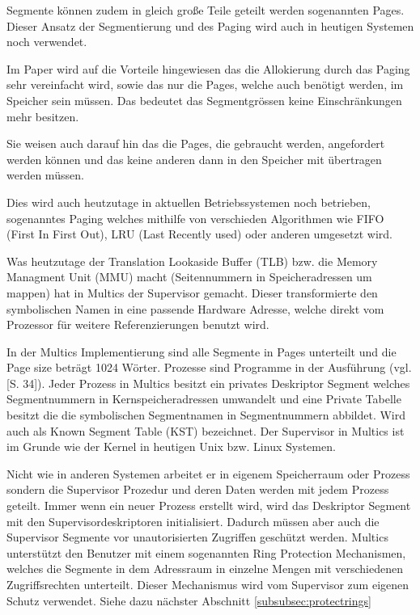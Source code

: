 \documentclass[9pt,technote]{IEEEtran}
\begin{document}
	      Segmente k\"onnen zudem in gleich gro\ss e Teile geteilt werden sogenannten Pages. Dieser Ansatz der Segmentierung
	      und des Paging wird auch in heutigen Systemen noch verwendet.
	     
	      Im Paper \cite{inproc:multics} wird auf die Vorteile hingewiesen das die Allokierung durch das Paging sehr vereinfacht wird,
	      sowie das nur die Pages, welche auch ben\"otigt werden, im Speicher sein m\"ussen. 
	      Das bedeutet das Segmentgr\"ossen keine Einschr\"ankungen mehr besitzen.
	     
	      Sie weisen auch darauf hin das die Pages, die gebraucht werden, angefordert werden k\"onnen und das keine anderen dann in 
	      den Speicher mit \"ubertragen werden m\"ussen.
	     
	      Dies wird auch heutzutage in aktuellen Betriebssystemen noch betrieben, sogenanntes Paging welches mithilfe von
	      verschieden Algorithmen wie FIFO (First In First Out), LRU (Last Recently used) oder anderen umgesetzt wird.
	 
	      Was heutzutage der Translation Lookaside Buffer (TLB) bzw. die Memory Managment Unit (MMU) macht
	      (Seitennummern in Speicheradressen um mappen) hat in Multics der Supervisor gemacht.
	      Dieser transformierte den symbolischen Namen in eine passende Hardware Adresse, welche direkt vom Prozessor f\"ur weitere Referenzierungen benutzt wird.
	 
	      In der Multics Implementierung sind alle Segmente in Pages unterteilt und die Page size betr\"agt 1024 W\"orter.
        Prozesse sind Programme in der Ausf\"uhrung (vgl. \cite{inproc:multics}[S. 34]). 
		    Jeder Prozess in Multics besitzt ein privates Deskriptor Segment welches Segmentnummern in Kernspeicheradressen umwandelt und eine Private Tabelle besitzt   
		    die die symbolischen Segmentnamen in Segmentnummern abbildet. Wird auch als Known Segment Table (KST) bezeichnet.
		    Der Supervisor in Multics ist im Grunde wie der Kernel in heutigen Unix bzw. Linux Systemen.

    		Nicht wie in anderen Systemen arbeitet er in eigenem Speicherraum oder Prozess sondern die Supervisor Prozedur und deren Daten werden mit jedem Prozess
    	  geteilt. Immer wenn ein neuer Prozess erstellt wird, wird das Deskriptor Segment mit den Supervisordeskriptoren initialisiert.
    	  Dadurch m\"ussen aber auch die Supervisor Segmente vor unautorisierten Zugriffen gesch\"utzt werden.
    	  Multics unterst\"utzt den Benutzer mit einem sogenannten Ring Protection Mechanismen, welches die Segmente in dem Adressraum in einzelne Mengen mit 
    		verschiedenen Zugriffsrechten unterteilt. Dieser Mechanismus wird vom Supervisor zum eigenen Schutz verwendet. Siehe dazu n\"achster Abschnitt 
    		\ref{subsubsec:protectrings}
    		
\end{document}
